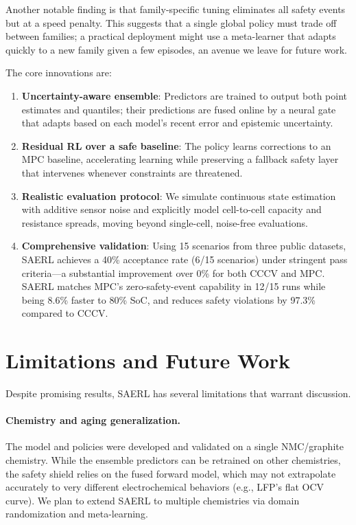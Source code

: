 \documentclass[%
 aip,
 amsmath,amssymb,
reprint, onecolumn %
]{revtex4-1}
\begin{document}
Another notable finding is that family-specific tuning eliminates all safety events but at a speed penalty. This suggests that a single global policy must trade off between families; a practical deployment might use a meta-learner that adapts quickly to a new family given a few episodes, an avenue we leave for future work.

The core innovations are:

\begin{enumerate}[leftmargin=*]
    \item \textbf{Uncertainty-aware ensemble}: Predictors are trained to output both point estimates and quantiles; their predictions are fused online by a neural gate that adapts based on each model's recent error and epistemic uncertainty.
    \item \textbf{Residual RL over a safe baseline}: The policy learns corrections to an MPC baseline, accelerating learning while preserving a fallback safety layer that intervenes whenever constraints are threatened.
    \item \textbf{Realistic evaluation protocol}: We simulate continuous state estimation with additive sensor noise and explicitly model cell-to-cell capacity and resistance spreads, moving beyond single-cell, noise-free evaluations.
    \item \textbf{Comprehensive validation}: Using 15 scenarios from three public datasets, SAERL achieves a 40\% acceptance rate (6/15 scenarios) under stringent pass criteria---a substantial improvement over 0\% for both CCCV and MPC. SAERL matches MPC's zero-safety-event capability in 12/15 runs while being 8.6\% faster to 80\% SoC, and reduces safety violations by 97.3\% compared to CCCV.
\end{enumerate}


\section{Limitations and Future Work}
\label{sec:limitations}

Despite promising results, SAERL has several limitations that warrant discussion.

\paragraph{Chemistry and aging generalization.}
The model and policies were developed and validated on a single NMC/graphite chemistry. While the ensemble predictors can be retrained on other chemistries, the safety shield relies on the fused forward model, which may not extrapolate accurately to very different electrochemical behaviors (e.g., LFP's flat OCV curve). We plan to extend SAERL to multiple chemistries via domain randomization and meta-learning.
\end{document}

